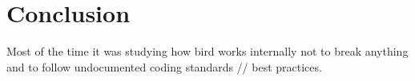 \chapter*{Conclusion}

Most of the time it was studying how bird works internally not to break
anything and to follow undocumented coding standards // best practices.
